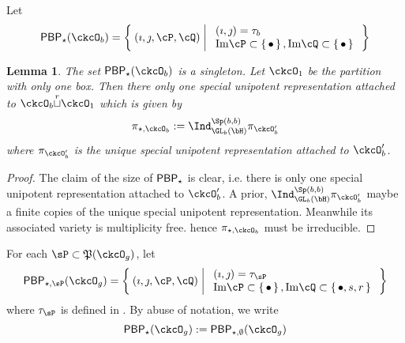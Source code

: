 \documentclass[12pt,a4paper]{amsart}
\def\Im{\operatorname{Im}}
\numberwithin{equation}{section}
\newtheorem{lem}[thm]{Lemma}
\theoremstyle{remark}
\def\Im{\mathrm{Im}}
\def\cuprow{{\stackrel{r}{\sqcup}}}
\def\CPP{\mathfrak{P}}
\begin{document}
Let
\[
  \PBP_{\star}(\ckcO_{b}) = \Set{(\imath,\jmath, \cP,\cQ) | %
    \begin{array}{l}
      (\imath,\jmath) = \tau_{b}\\
      \Im \cP \subset \set{\bullet}, \Im \cQ \subset\set{\bullet
      }\\
    \end{array}
  }
\]

\begin{lem}\label{lem:bp.C*}
  The set $\PBP_{\star}(\ckcO_{b})$ is a singleton.
  Let $\ckcO_{1}$ be the partition with only one box.
  Then  there only one special unipotent representation
  attached to $\ckcO_{b}\cuprow \ckcO_{1}$ which is given by
  \[
    \pi_{\star,\ckcO_{b}}:=
    \Ind_{\GL_{b}(\bH)}^{\Sp(b,b)}\pi_{\ckcO'_{b}}
  \]
  where $\pi_{\ckcO'_{b}}$ is the unique special unipotent representation
  attached
  to $\ckcO'_{b}$.
\end{lem}
\begin{proof}
  The claim of the size of $\mathsf{PBP}_{\star}$ is clear, i.e. there is only one
  special unipotent representation attached to $\ckcO'_{b}$. A prior,
  $\Ind_{\GL_{b}(\bH)}^{\Sp(b,b)}\pi_{\ckcO'_{b}}$ maybe a finite copies of the
  unique special unipotent representation. Meanwhile its associated variety is
  multiplicity free. hence $\pi_{\star,\ckcO_{b}}$ must be irreducible.
\end{proof}

For each $\sP\subset \CPP(\ckcO_{g})$, let
\[
  \PBP_{\star,\sP}(\ckcO_g)= \Set{(\imath,\jmath,\cP,\cQ)| %
    \begin{array}{l}
      (\imath,\jmath) = \tau_{\sP}\\
      \Im \cP \subset \set{\bullet}, \Im \cQ \subset\set{\bullet, s,r}\\
    \end{array}
  }
\]
where $\tau_{\sP}$ is defined in .
By abuse of notation, we write
\[
\PBP_{\star}(\ckcO_g) :=\PBP_{\star,\emptyset}(\ckcO_g)
\]
\end{document}
